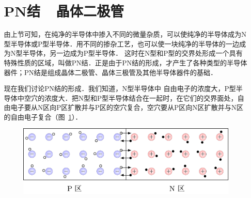 \section{PN结~~晶体二极管}
由上节可知，在纯净的半导体中掺入不同的微量杂质，可以使纯净的半导体成为N型半导体或P型半导体．用不同的掺杂工艺，也可以使一块纯净的半导体的一边成为N型半导体，另一边成为P型半导体．
这时在N型和P型的交界处形成一个具有特殊性质的区域，叫做PN结．正是由于PN结的形成，才产生了各种类型的半导体器件；PN结是组成晶体二极管、晶体三极管及其他半导体器件的基础．


现在我们讨论PN结的形成．我们知道，N型半导体中
自由电子的浓度大，P型半导体中空穴的浓度大．把N型和P型半导体结合在一起时，在它们的交界面处，自由电子要从N区向P区扩散并与P区的空穴复合，空穴要从P区向N区扩散并与N区的自由电子复合（图~\ref{fig_B_8-22}）．

\begin{figure}[htbp]
	\centering
	\includegraphics{fig/B/8-22.pdf}
	\caption{}\label{fig_B_8-22}
\end{figure}

